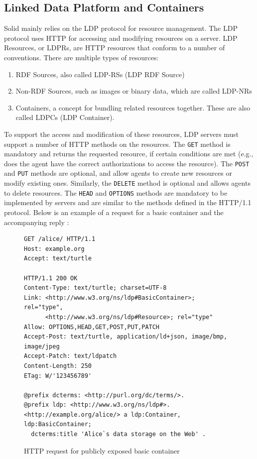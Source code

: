 \subsection{Linked Data Platform and Containers}
\label{subsec:ldp}
Solid mainly relies on the \gls{LDP} protocol \citep{ldp} for resource management. The \gls{LDP} protocol uses HTTP for accessing and modifying resources on a server. LDP Resources, or LDPRs, are HTTP resources that conform to a number of conventions. There are multiple types of resources:
\begin{enumerate}
    \item \gls{RDF} Sources, also called LDP-RSs (\gls{LDP} \gls{RDF} Source)
    \item Non-\gls{RDF} Sources, such as images or binary data, which are called LDP-NRs
    \item Containers, a concept for bundling related resources together. These are also called LDPCs (\gls{LDP} Container). 
\end{enumerate}

\noindent To support the access and modification of these resources, \gls{LDP} servers must support a number of HTTP methods on the resources. The \texttt{GET} method is mandatory and returns the requested resource, if certain conditions are met (e.g., does the agent have the correct authorizations to access the resource). The \texttt{POST} and \texttt{PUT} methods are optional, and allow agents to create new resources or modify existing ones. Similarly, the \texttt{DELETE} method is optional and allows agents to delete resources. The \texttt{HEAD} and \texttt{OPTIONS} methods are mandatory to be implemented by servers and are similar to the methods defined in the HTTP/1.1 protocol. Below is an example of a request for a basic container and the accompanying reply \citep[from][]{ldp-primer}:
\begin{figure}[H]
    \begin{verbatim}
GET /alice/ HTTP/1.1
Host: example.org
Accept: text/turtle

HTTP/1.1 200 OK 
Content-Type: text/turtle; charset=UTF-8
Link: <http://www.w3.org/ns/ldp#BasicContainer>; rel="type", 
      <http://www.w3.org/ns/ldp#Resource>; rel="type"
Allow: OPTIONS,HEAD,GET,POST,PUT,PATCH
Accept-Post: text/turtle, application/ld+json, image/bmp, image/jpeg
Accept-Patch: text/ldpatch
Content-Length: 250
ETag: W/'123456789'
	
@prefix dcterms: <http://purl.org/dc/terms/>.
@prefix ldp: <http://www.w3.org/ns/ldp#>.
<http://example.org/alice/> a ldp:Container, ldp:BasicContainer;
  dcterms:title 'Alice`s data storage on the Web' .	
\end{verbatim}
    \caption{HTTP request for publicly exposed basic container}
    \label{fig:ldpc-request}
\end{figure}

